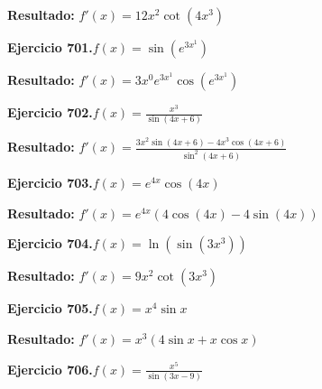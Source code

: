 \documentclass[10pt,a4paper]{article}
\begin{document}
\begin{solbox}
\textbf{Resultado:} \(\displaystyle f'(x) = 12x^{2}\cot(4x^{3})\)
\end{solbox}

\begin{ejbox}
\textbf{Ejercicio 701.}\quad $f(x) = \sin(e^{3x^{1}})$
\end{ejbox}

\begin{solbox}
\textbf{Resultado:} \(\displaystyle f'(x) = 3x^{0}e^{3x^{1}}\cos(e^{3x^{1}})\)
\end{solbox}

\begin{ejbox}
\textbf{Ejercicio 702.}\quad $f(x) = \frac{x^{3}}{\sin(4x +6)}$
\end{ejbox}

\begin{solbox}
\textbf{Resultado:} \(\displaystyle f'(x) = \frac{3x^{2}\sin(4x +6) - 4x^{3}\cos(4x +6)}{\sin^2(4x +6)}\)
\end{solbox}

\newpage
\begin{ejbox}
\textbf{Ejercicio 703.}\quad $f(x) = e^{4x} \cos(4x)$
\end{ejbox}

\begin{solbox}
\textbf{Resultado:} \(\displaystyle f'(x) = e^{4x}(4\cos(4x) - 4\sin(4x))\)
\end{solbox}

\begin{ejbox}
\textbf{Ejercicio 704.}\quad $f(x) = \ln(\sin(3x^{3}))$
\end{ejbox}

\begin{solbox}
\textbf{Resultado:} \(\displaystyle f'(x) = 9x^{2}\cot(3x^{3})\)
\end{solbox}

\begin{ejbox}
\textbf{Ejercicio 705.}\quad $f(x) = x^{4} \sin x$
\end{ejbox}

\begin{solbox}
\textbf{Resultado:} \(\displaystyle f'(x) = x^{3}(4\sin x + x\cos x)\)
\end{solbox}

\newpage
\begin{ejbox}
\textbf{Ejercicio 706.}\quad $f(x) = \frac{x^{5}}{\sin(3x -9)}$
\end{ejbox}
\end{document}
